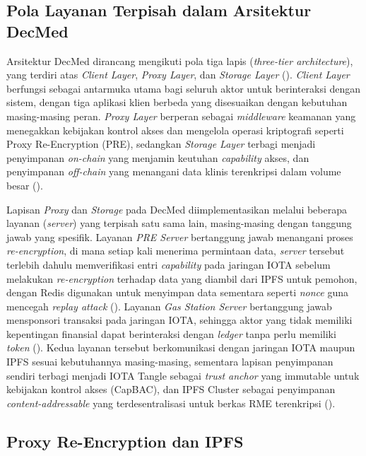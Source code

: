 \subsection{Pola Layanan Terpisah dalam Arsitektur DecMed}
\label{subsec:pola-layanan-decmed}

Arsitektur DecMed dirancang mengikuti pola tiga lapis (\textit{three-tier architecture}), yang terdiri atas \textit{Client Layer}, \textit{Proxy Layer}, dan \textit{Storage Layer} (\cite{DecMed}). \textit{Client Layer} berfungsi sebagai antarmuka utama bagi seluruh aktor untuk berinteraksi dengan sistem, dengan tiga aplikasi klien berbeda yang disesuaikan dengan kebutuhan masing-masing peran. \textit{Proxy Layer} berperan sebagai \textit{middleware} keamanan yang menegakkan kebijakan kontrol akses dan mengelola operasi kriptografi seperti Proxy Re-Encryption (PRE), sedangkan \textit{Storage Layer} terbagi menjadi penyimpanan \textit{on-chain} yang menjamin keutuhan \textit{capability} akses, dan penyimpanan \textit{off-chain} yang menangani data klinis terenkripsi dalam volume besar (\cite{DecMed}).

Lapisan \textit{Proxy} dan \textit{Storage} pada DecMed diimplementasikan melalui beberapa layanan (\textit{server}) yang terpisah satu sama lain, masing-masing dengan tanggung jawab yang spesifik. Layanan \textit{PRE Server} bertanggung jawab menangani proses \textit{re-encryption}, di mana setiap kali menerima permintaan data, \textit{server} tersebut terlebih dahulu memverifikasi entri \textit{capability} pada jaringan IOTA sebelum melakukan \textit{re-encryption} terhadap data yang diambil dari IPFS untuk pemohon, dengan Redis digunakan untuk menyimpan data sementara seperti \textit{nonce} guna mencegah \textit{replay attack} (\cite{DecMed}). Layanan \textit{Gas Station Server} bertanggung jawab mensponsori transaksi pada jaringan IOTA, sehingga aktor yang tidak memiliki kepentingan finansial dapat berinteraksi dengan \textit{ledger} tanpa perlu memiliki \textit{token} (\cite{DecMed}). Kedua layanan tersebut berkomunikasi dengan jaringan IOTA maupun IPFS sesuai kebutuhannya masing-masing, sementara lapisan penyimpanan sendiri terbagi menjadi IOTA Tangle sebagai \textit{trust anchor} yang immutable untuk kebijakan kontrol akses (CapBAC), dan IPFS Cluster sebagai penyimpanan \textit{content-addressable} yang terdesentralisasi untuk berkas RME terenkripsi (\cite{DecMed}).

\subsection{Proxy Re-Encryption dan IPFS}
\label{subsec:pre-ipfs}

